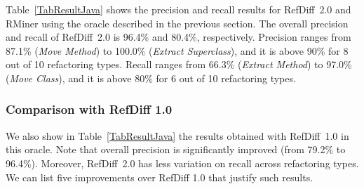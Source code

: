Table~\ref{TabResultJava} shows the precision and recall results for RefDiff~2.0 and RMiner using the oracle described in the previous section. The overall precision and recall of RefDiff~2.0 is 96.4\% and 80.4\%, respectively.
Precision ranges from 87.1\% (\emph{Move Method}) to 100.0\% (\emph{Extract Superclass}), and it is above 90\% for 8 out of 10 refactoring types.
Recall ranges from 66.3\% (\emph{Extract Method}) to 97.0\% (\emph{Move Class}), and it is above 80\% for 6 out of 10 refactoring types.


\subsubsection{Comparison with RefDiff 1.0}

We also show in Table~\ref{TabResultJava} the results obtained with RefDiff~1.0 in this oracle. Note that overall precision is significantly improved (from 79.2\% to 96.4\%). Moreover, RefDiff~2.0 has less variation on recall across refactoring types.
We can list five improvements over RefDiff 1.0 that justify such results.
